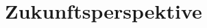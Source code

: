 \documentclass[../main.tex]{subfiles}
\begin{document}
\chapter{Zukunftsperspektive}
\end{document}
